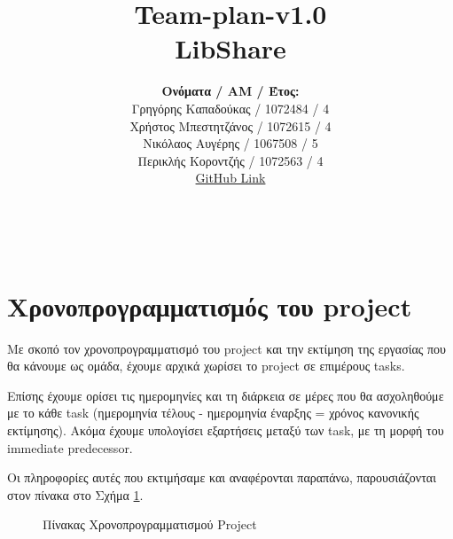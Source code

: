 \documentclass[12pt,a4paper]{article}
\title{Team-plan-v1.0 \\ LibShare}
\author{\textbf{Ονόματα / ΑΜ / Έτος:} \\ Γρηγόρης Καπαδούκας / 1072484 / 4\textdegree \\ Χρήστος Μπεστητζάνος / 1072615 / 4\textdegree \\ Νικόλαος Αυγέρης / 1067508 / 5\textdegree \\ Περικλής Κοροντζής / 1072563 / 4\textdegree\\ \href{https://github.com/GregKapadoukas/University-Software-Engineering-Project}{\color{blue}GitHub Link}}
\begin{document}
\makeatletter
\begin{center}
	\LARGE{\@title} \\
	\pagebreak
    \begin{LARGE}\@author\end{LARGE}
\pagebreak
\end{center}

\section{Χρονοπρογραμματισμός του project}
Με σκοπό τον χρονοπρογραμματισμό του project και την εκτίμηση της εργασίας που θα κάνουμε ως ομάδα, έχουμε αρχικά χωρίσει το project σε επιμέρους tasks.

Επίσης έχουμε ορίσει τις ημερομηνίες και τη διάρκεια σε μέρες που θα ασχοληθούμε με το κάθε task (ημερομηνία τέλους - ημερομηνία έναρξης = χρόνος κανονικής εκτίμησης). Ακόμα έχουμε υπολογίσει εξαρτήσεις μεταξύ των task, με τη μορφή του immediate predecessor.

Οι πληροφορίες αυτές που εκτιμήσαμε και αναφέρονται παραπάνω, παρουσιάζονται στον πίνακα στο Σχήμα \ref{Πίνακας Χρονοπρογραμματισμού Project}.

\begin{figure}[H]
	\caption{Πίνακας Χρονοπρογραμματισμού Project}
	\label{Πίνακας Χρονοπρογραμματισμού Project}
\end{figure}
\end{document}
